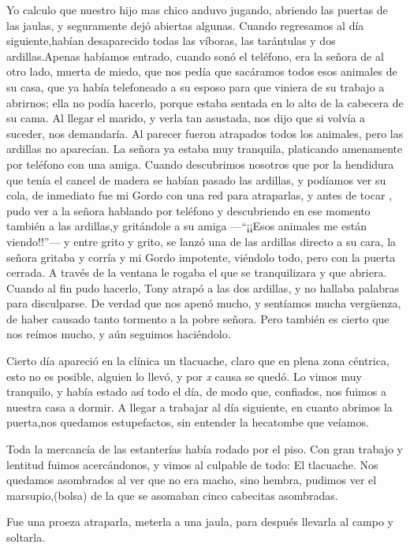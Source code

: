 \documentclass[letterpaper, 12pt]{book}
\begin{document}
Yo calculo que nuestro hijo mas chico anduvo jugando, abriendo las puertas de las jaulas, y seguramente dejó abiertas algunas. Cuando regresamos al día siguiente,habían desaparecido todas las víboras, las tarántulas y dos ardillas.Apenas habíamos entrado, cuando sonó el teléfono, era la señora de al otro lado, muerta de miedo, que nos pedía que sacáramos todos esos animales de su casa, que ya había telefoneado a su esposo para que viniera de su trabajo a abrirnos; ella no podía hacerlo, porque estaba sentada en lo alto de la cabecera de su cama. Al llegar el marido, y verla tan asustada, nos dijo que si volvía a suceder, nos demandaría. Al parecer fueron atrapados todos los animales, pero las ardillas no aparecían. La señora ya estaba muy tranquila, platicando amenamente  por teléfono con una amiga. Cuando descubrimos nosotros que por la hendidura que tenía el cancel de madera se habían pasado las ardillas, y podíamos ver su cola, de inmediato fue mi Gordo con una red para atraparlas, y antes de tocar , pudo ver a la señora hablando por teléfono y descubriendo en ese momento también a las ardillas,y gritándole a su amiga ---``¡¡Esos animales me están viendo!!''--- y entre grito y grito, se lanzó una de las ardillas directo a su cara, la señora gritaba y corría y mi Gordo impotente, viéndolo todo, pero con la puerta cerrada. A través de la ventana le rogaba el que se tranquilizara y que abriera. Cuando al fin pudo hacerlo, Tony atrapó a las dos ardillas, y no hallaba palabras para disculparse. De verdad que nos apenó mucho, y sentíamos mucha vergüenza, de haber causado tanto tormento a la pobre señora. Pero también  es cierto que nos reímos mucho, y aún seguimos haciéndolo.

Cierto día apareció en la clínica un tlacuache, claro que en plena zona céntrica, esto no es posible, alguien lo llevó, y por {\it x } causa se quedó. Lo vimos muy tranquilo, y había estado así todo el día, de modo que, confiados, nos fuimos a nuestra casa a dormir. A llegar a trabajar al día siguiente, en cuanto abrimos la puerta,nos quedamos estupefactos, sin entender la hecatombe que veíamos.

Toda la mercancía de las estanterías había rodado por el piso. Con gran trabajo y lentitud fuimos acercándonos, y vimos al culpable de todo: El tlacuache. Nos quedamos asombrados al ver que no era macho, sino hembra, pudimos ver el marsupio,(bolsa) de la que se asomaban cinco cabecitas asombradas.

Fue una proeza atraparla, meterla a una jaula, para después llevarla al campo y soltarla.
\end{document}
